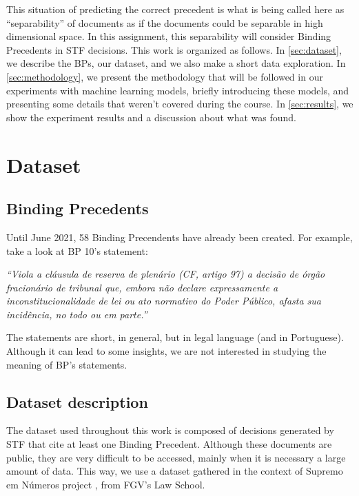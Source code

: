\documentclass[twocolumn]{article}
\begin{document}
            This situation of predicting the correct precedent is what is being called here as ``separability'' of documents as if the documents could be separable in high dimensional space. In this assignment, this separability will consider Binding Precedents in STF decisions. This work is organized as follows. In \autoref{sec:dataset}, we describe the BPs, our dataset, and we also make a short data exploration. In \autoref{sec:methodology}, we present the methodology that will be followed in our experiments with machine learning models, briefly introducing these models, and presenting some details that weren't covered during the course. In \autoref{sec:results}, we show the experiment results and a discussion about what was found.

      \section{Dataset}
            \label{sec:dataset}

            \subsection{Binding Precedents}

                  Until June 2021, 58 Binding Precendents have already been created. For example, take a look at BP 10's statement:

                  \textit{``Viola a cláusula de reserva de plenário (CF, artigo 97) a decisão de órgão fracionário de tribunal que, embora não declare expressamente a inconstitucionalidade de lei ou ato normativo do Poder Público, afasta sua incidência, no todo ou em parte.''}
                  
                  The statements are short, in general, but in legal language (and in Portuguese). Although it can lead to some insights, we are not interested in studying the meaning of BP's statements.

            \subsection{Dataset description}

                  The dataset used throughout this work is composed of decisions generated by STF that cite at least one Binding Precedent. Although these documents are public, they are very difficult to be accessed, mainly when it is necessary a large amount of data. This way, we use a dataset gathered in the context of Supremo em Números project \cite{falcao2013relatorio}, from FGV's Law School.
\end{document}
